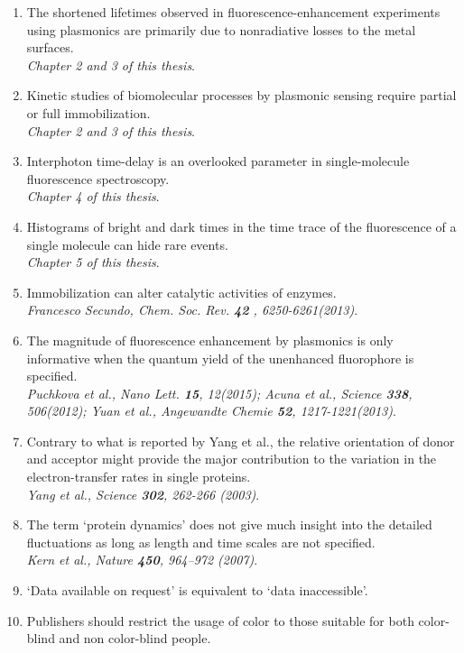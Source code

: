 \documentclass{dissertation}
\begin{document}
\newcommand{\refp}[1]{\\{\it \footnotesize #1}.}
\begin{enumerate}
	\item The shortened lifetimes observed in fluorescence-enhancement experiments using plasmonics are primarily due to nonradiative losses to the metal surfaces.
	\refp{Chapter 2 and 3 of this thesis}
	
	\item Kinetic studies of biomolecular processes by plasmonic sensing require partial or full immobilization. 
	\refp{Chapter 2 and 3 of this thesis}
	
	\item Interphoton time-delay is an overlooked parameter in single-molecule fluorescence spectroscopy.
	\refp{Chapter 4 of this thesis}
	
	\item Histograms of bright and dark times in the time trace of the fluorescence of a single molecule can hide rare events.
	\refp{Chapter 5 of this thesis}
	
	\item Immobilization can alter catalytic activities of enzymes.
	\refp{Francesco Secundo, Chem. Soc. Rev. \textbf{42} , 6250-6261(2013)}
	
	\item The magnitude of fluorescence enhancement by plasmonics is only informative when the quantum yield of the unenhanced fluorophore is specified.
	\refp{Puchkova et al., Nano Lett. \textbf{15}, 12(2015);
		  Acuna et al., Science \textbf{338}, 506(2012);
		  Yuan et al., Angewandte Chemie \textbf{52}, 1217-1221(2013)}

	\item Contrary to what is reported by Yang et al., the relative orientation of donor and acceptor might provide the major contribution to the variation in the electron-transfer rates in single proteins.
	\refp{Yang et al., Science \textbf{302}, 262-266 (2003)}
	
	\item The term `protein dynamics' does not give much insight into the detailed fluctuations as long as length and time scales are not specified.
	\refp{Kern et al., Nature \textbf{450}, 964–972 (2007)}
	
	\item `Data available on request' is equivalent to `data inaccessible'.

	\item Publishers should restrict the usage of color to those suitable for both color-blind and non color-blind people.
\end{enumerate}
\end{document}
